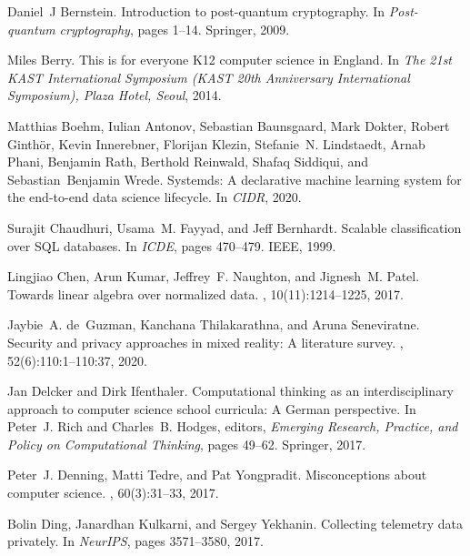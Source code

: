 \documentclass[11pt]{article}
\begin{document}
\begin{thebibliography}{10}
Daniel~J Bernstein.
\newblock Introduction to post-quantum cryptography.
\newblock In {\em Post-quantum cryptography}, pages 1--14. Springer, 2009.

Miles Berry.
\newblock This is for everyone {K}12 computer science in {E}ngland.
\newblock In {\em The 21st KAST International Symposium (KAST 20th Anniversary
  International Symposium), Plaza Hotel, Seoul}, 2014.

Matthias Boehm, Iulian Antonov, Sebastian Baunsgaard, Mark Dokter, Robert
  Ginth{\"{o}}r, Kevin Innerebner, Florijan Klezin, Stefanie~N. Lindstaedt,
  Arnab Phani, Benjamin Rath, Berthold Reinwald, Shafaq Siddiqui, and
  Sebastian~Benjamin Wrede.
\newblock Systemds: {A} declarative machine learning system for the end-to-end
  data science lifecycle.
\newblock In {\em CIDR}, 2020.

Surajit Chaudhuri, Usama~M. Fayyad, and Jeff Bernhardt.
\newblock Scalable classification over {SQL} databases.
\newblock In {\em ICDE}, pages 470--479. {IEEE}, 1999.

Lingjiao Chen, Arun Kumar, Jeffrey~F. Naughton, and Jignesh~M. Patel.
\newblock Towards linear algebra over normalized data.
, 10(11):1214--1225, 2017.

Jaybie~A. de~Guzman, Kanchana Thilakarathna, and Aruna Seneviratne.
\newblock Security and privacy approaches in mixed reality: {A} literature
  survey.
, 52(6):110:1--110:37, 2020.

Jan Delcker and Dirk Ifenthaler.
\newblock Computational thinking as an interdisciplinary approach to computer
  science school curricula: {A} {G}erman perspective.
\newblock In Peter~J. Rich and Charles~B. Hodges, editors, {\em Emerging
  Research, Practice, and Policy on Computational Thinking}, pages 49--62.
  Springer, 2017.

Peter~J. Denning, Matti Tedre, and Pat Yongpradit.
\newblock Misconceptions about computer science.
, 60(3):31--33, 2017.

Bolin Ding, Janardhan Kulkarni, and Sergey Yekhanin.
\newblock Collecting telemetry data privately.
\newblock In {\em NeurIPS}, pages 3571--3580, 2017.


\end{thebibliography}
\end{document}
